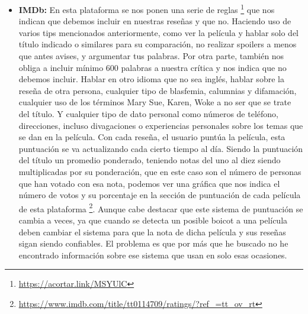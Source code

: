 \begin{itemize}
\item \textbf{IMDb:} En esta plataforma se nos ponen una serie de reglas \footnote{\url{https://acortar.link/MSYUlC}} que nos indican que debemos incluir en nuestras reseñas y que no. Haciendo uso de varios tips mencionados anteriormente, como ver la película y hablar solo del título indicado o similares para su comparación, no realizar spoilers a menos que antes avises, y argumentar tus palabras. Por otra parte, también nos obliga a incluir mínimo 600 palabras a nuestra crítica y nos indica que no debemos incluir. Hablar en otro idioma que no sea inglés, hablar sobre la reseña de otra persona, cualquier tipo de blasfemia, calumnias y difamación, cualquier uso de los términos Mary Sue, Karen, Woke a no ser que se trate del título. Y cualquier tipo de dato personal como números de teléfono, direcciones, incluso divagaciones o experiencias personales sobre los temas que se dan en la película. Con cada reseña, el usuario puntúa la película, esta puntuación se va actualizando cada cierto tiempo al día. Siendo la puntuación del título un promedio ponderado, teniendo notas del uno al diez siendo multiplicadas por su ponderación, que en este caso son el número de personas que han votado con esa nota, podemos ver una gráfica que nos indica el número de votos y su porcentaje en la sección de puntuación de cada película de esta plataforma \footnote{\url{https://www.imdb.com/title/tt0114709/ratings/?ref_=tt_ov_rt}}. Aunque cabe destacar que este sistema de puntuación se cambia a veces, ya que cuando se detecta un posible boicot a una película deben cambiar el sistema para que la nota de dicha película y sus reseñas sigan siendo confiables. El problema es que por más que he buscado no he encontrado información sobre ese sistema que usan en solo esas ocasiones.

\end{itemize}
